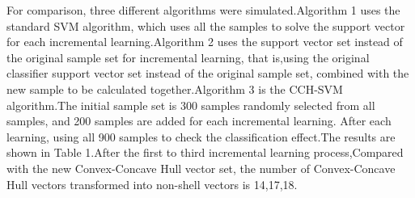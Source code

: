 \documentclass[a4paper]{article}
\begin{document}
For comparison, three different algorithms were simulated.Algorithm 1 uses the standard SVM algorithm, which uses all the samples to solve the support vector for each incremental learning.Algorithm 2 uses the support vector set instead of the original sample set for incremental learning, that is,using the original classifier support vector set instead of the original sample set, combined with the new sample to be calculated together.Algorithm 3 is the CCH-SVM algorithm.The initial sample set is 300 samples randomly selected from all samples, and 200 samples are added for each incremental learning. After each learning, using all 900 samples to check the classification effect.The results are shown in Table 1.After the first to third incremental learning process,Compared with the new Convex-Concave Hull vector set, the number of Convex-Concave Hull vectors transformed into non-shell vectors is 14,17,18.
\end{document}
